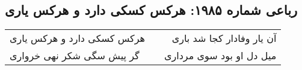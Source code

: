 \begin{center}
\section*{رباعی شماره ۱۹۸۵: هرکس کسکی دارد و هرکس یاری}
\label{sec:1985}
\begin{longtable}{l p{0.5cm} r}
هرکس کسکی دارد و هرکس یاری
&&
آن یار وفادار کجا شد باری
\\
گر پیش سگی شکر نهی خرواری
&&
میل دل او بود سوی مرداری
\\
\end{longtable}
\end{center}
